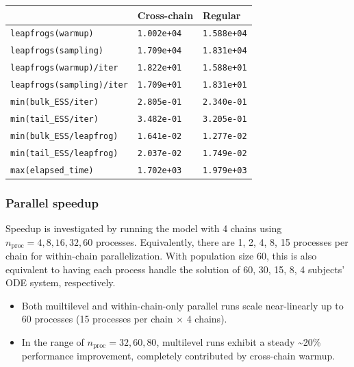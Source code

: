 \documentclass[landscape,a0paper,fontscale=0.45]{baposter} %
\begin{document}
\begin{poster}
{\begin{multicols}{2}
\begin{center}
\footnotesize
\begin{tabular}{l l l}
\hline
 & Cross-chain & Regular \\
\hline
 \texttt{leapfrogs(warmup)}        &  \texttt{1.002e+04}  & \texttt{1.588e+04}\\
 \texttt{leapfrogs(sampling)}      &  \texttt{1.709e+04}  & \texttt{1.831e+04}\\
 \texttt{leapfrogs(warmup)/iter}   &  \texttt{1.822e+01}  & \texttt{1.588e+01}\\
 \texttt{leapfrogs(sampling)/iter} &  \texttt{1.709e+01}  & \texttt{1.831e+01}\\
 \texttt{min(bulk\_ESS/iter)}       & \texttt{2.805e-01}  & \texttt{2.340e-01}\\
 \texttt{min(tail\_ESS/iter)}       & \texttt{3.482e-01}  & \texttt{3.205e-01}\\
 \texttt{min(bulk\_ESS/leapfrog)}   & \texttt{1.641e-02}  & \texttt{1.277e-02}\\
 \texttt{min(tail\_ESS/leapfrog)}   & \texttt{2.037e-02}  & \texttt{1.749e-02}\\
 \texttt{max(elapsed\_time)}        & \texttt{1.702e+03}  & \texttt{1.979e+03}\\
\hline
\end{tabular}
\label{tab:ttpn}
\end{center}

\subsubsection*{Parallel speedup}
Speedup is investigated by running the model
with 4 chains using \(n_{\text{proc}} = 4, 8, 16, 32, 60\)
processes. Equivalently, there are
1, 2, 4, 8, 15 processes per chain for within-chain parallelization.
With population size 60, this is also equivalent to having each process handle the solution of
60, 30, 15, 8, 4 subjects' ODE system, respectively.
\begin{itemize}
\item Both muiltilevel and within-chain-only parallel runs scale near-linearly up to 60
  processes (15 processes per chain \(\times\) 4 chains).
\item In the range of \(n_{\text{proc}}=32, 60, 80\), multilevel runs
  exhibit a steady \textasciitilde 20\% performance improvement, completely
  contributed by cross-chain warmup.
\end{itemize}


\end{multicols}}
\end{poster}
\end{document}

